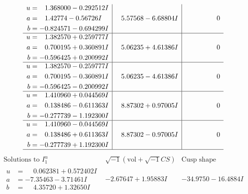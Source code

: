 \documentclass[1p]{elsarticle_modified}
\theoremstyle{definition}
\newcommand{\I}{\sqrt{-1}}
\begin{document}
$$\begin{array}{c|c|c}
\begin{aligned}
u &= \phantom{-}1.368000 - 0.292512 I \\
a &= \phantom{-}1.42774 - 0.56726 I \\
b &= -0.824571 - 0.694299 I\end{aligned}
 & \phantom{-}5.57568 - 6.68804 I & \phantom{-0.000000 } 0 \\ \hline\begin{aligned}
u &= \phantom{-}1.382570 + 0.259777 I \\
a &= \phantom{-}0.700195 + 0.360891 I \\
b &= -0.596425 + 0.200992 I\end{aligned}
 & \phantom{-}5.06235 + 4.61386 I & \phantom{-0.000000 } 0 \\ \hline\begin{aligned}
u &= \phantom{-}1.382570 - 0.259777 I \\
a &= \phantom{-}0.700195 - 0.360891 I \\
b &= -0.596425 - 0.200992 I\end{aligned}
 & \phantom{-}5.06235 - 4.61386 I & \phantom{-0.000000 } 0 \\ \hline\begin{aligned}
u &= \phantom{-}1.410960 + 0.044569 I \\
a &= \phantom{-}0.138486 - 0.611363 I \\
b &= -0.277739 - 1.192300 I\end{aligned}
 & \phantom{-}8.87302 + 0.97005 I & \phantom{-0.000000 } 0 \\ \hline\begin{aligned}
u &= \phantom{-}1.410960 - 0.044569 I \\
a &= \phantom{-}0.138486 + 0.611363 I \\
b &= -0.277739 + 1.192300 I\end{aligned}
 & \phantom{-}8.87302 - 0.97005 I & \phantom{-0.000000 } 0\\
 \hline 
 \end{array}$$\newpage$$\begin{array}{c|c|c}  
\text{Solutions to }I^u_{1}& \I (\text{vol} + \sqrt{-1}CS) & \text{Cusp shape}\\
 \hline 
\begin{aligned}
u &= \phantom{-}0.062381 + 0.572402 I \\
a &= -7.35463 - 3.71461 I \\
b &= \phantom{-}4.35720 + 1.32650 I\end{aligned}
 & -2.67647 + 1.95883 I & -34.9750 - 16.4884 I \\ \hline\begin{aligned}

\end{aligned}
\end{array}$$
\end{document}
